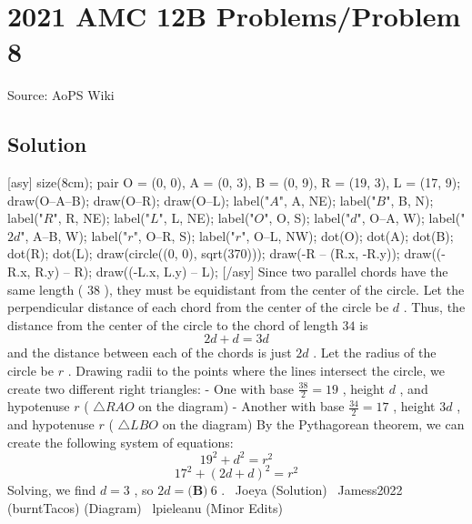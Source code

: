 \documentclass[12pt]{article}
\begin{document}
\section*{{2021 AMC 12B Problems/Problem 8}}
Source: AoPS Wiki

\subsection*{Solution}
[asy] size(8cm); pair O = (0, 0), A = (0, 3), B = (0, 9), R = (19, 3), L = (17, 9); draw(O--A--B); draw(O--R); draw(O--L); label("$A$", A, NE); label("$B$", B, N); label("$R$", R, NE); label("$L$", L, NE); label("$O$", O, S); label("$d$", O--A, W); label("$2d$", A--B, W); label("$r$", O--R, S); label("$r$", O--L, NW); dot(O); dot(A); dot(B); dot(R); dot(L); draw(circle((0, 0), sqrt(370))); draw(-R -- (R.x, -R.y)); draw((-R.x, R.y) -- R); draw((-L.x, L.y) -- L); [/asy] Since two parallel chords have the same length ( $38$ ), they must be equidistant from the center of the circle. Let the perpendicular distance of each chord from the center of the circle be $d$ . Thus, the distance from the center of the circle to the chord of length $34$ is \[2d + d = 3d\] and the distance between each of the chords is just $2d$ . Let the radius of the circle be $r$ . Drawing radii to the points where the lines intersect the circle, we create two different right triangles: - One with base $\frac{38}{2}= 19$ , height $d$ , and hypotenuse $r$ ( $\triangle RAO$ on the diagram) - Another with base $\frac{34}{2} = 17$ , height $3d$ , and hypotenuse $r$ ( $\triangle LBO$ on the diagram) By the Pythagorean theorem, we can create the following system of equations: \[19^2 + d^2 = r^2\] \[17^2 + (2d + d)^2 = r^2\] Solving, we find $d = 3$ , so $2d = \boxed{\textbf{(B)}\ 6}$ . ~Joeya (Solution)
~Jamess2022 (burntTacos) (Diagram)
~lpieleanu (Minor Edits)
\end{document}
